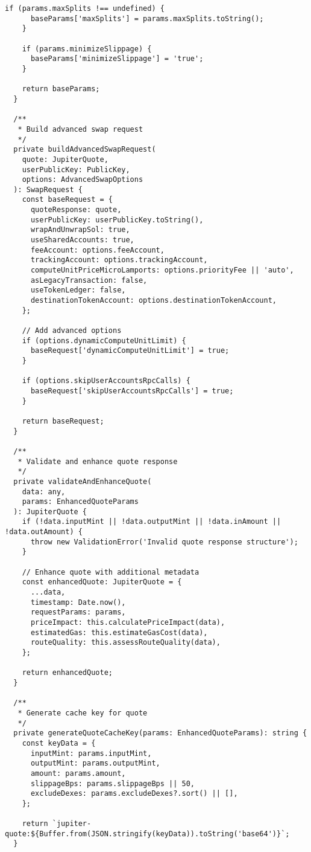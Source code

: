 \documentclass[11pt,a4paper]{article}
\begin{document}
\begin{lstlisting}[style=typescript, caption=Advanced Jupiter API v6 Service]
    if (params.maxSplits !== undefined) {
      baseParams['maxSplits'] = params.maxSplits.toString();
    }

    if (params.minimizeSlippage) {
      baseParams['minimizeSlippage'] = 'true';
    }

    return baseParams;
  }

  /**
   * Build advanced swap request
   */
  private buildAdvancedSwapRequest(
    quote: JupiterQuote,
    userPublicKey: PublicKey,
    options: AdvancedSwapOptions
  ): SwapRequest {
    const baseRequest = {
      quoteResponse: quote,
      userPublicKey: userPublicKey.toString(),
      wrapAndUnwrapSol: true,
      useSharedAccounts: true,
      feeAccount: options.feeAccount,
      trackingAccount: options.trackingAccount,
      computeUnitPriceMicroLamports: options.priorityFee || 'auto',
      asLegacyTransaction: false,
      useTokenLedger: false,
      destinationTokenAccount: options.destinationTokenAccount,
    };

    // Add advanced options
    if (options.dynamicComputeUnitLimit) {
      baseRequest['dynamicComputeUnitLimit'] = true;
    }

    if (options.skipUserAccountsRpcCalls) {
      baseRequest['skipUserAccountsRpcCalls'] = true;
    }

    return baseRequest;
  }

  /**
   * Validate and enhance quote response
   */
  private validateAndEnhanceQuote(
    data: any, 
    params: EnhancedQuoteParams
  ): JupiterQuote {
    if (!data.inputMint || !data.outputMint || !data.inAmount || !data.outAmount) {
      throw new ValidationError('Invalid quote response structure');
    }

    // Enhance quote with additional metadata
    const enhancedQuote: JupiterQuote = {
      ...data,
      timestamp: Date.now(),
      requestParams: params,
      priceImpact: this.calculatePriceImpact(data),
      estimatedGas: this.estimateGasCost(data),
      routeQuality: this.assessRouteQuality(data),
    };

    return enhancedQuote;
  }

  /**
   * Generate cache key for quote
   */
  private generateQuoteCacheKey(params: EnhancedQuoteParams): string {
    const keyData = {
      inputMint: params.inputMint,
      outputMint: params.outputMint,
      amount: params.amount,
      slippageBps: params.slippageBps || 50,
      excludeDexes: params.excludeDexes?.sort() || [],
    };

    return `jupiter-quote:${Buffer.from(JSON.stringify(keyData)).toString('base64')}`;
  }


\end{lstlisting}
\end{document}
